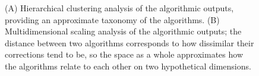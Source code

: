\documentclass[doc,biblatex]{apa7}
\begin{document}
	\begin{figure}
	\vspace*{2pt}
	\caption{(A) Hierarchical clustering analysis of the algorithmic outputs, providing an approximate taxonomy of the algorithms. (B) Multidimensional scaling analysis of the algorithmic outputs; the distance between two algorithms corresponds to how dissimilar their corrections tend to be, so the space as a whole approximates how the algorithms relate to each other on two hypothetical dimensions.}
	\label{fig12}
	\end{figure}
\end{document}
